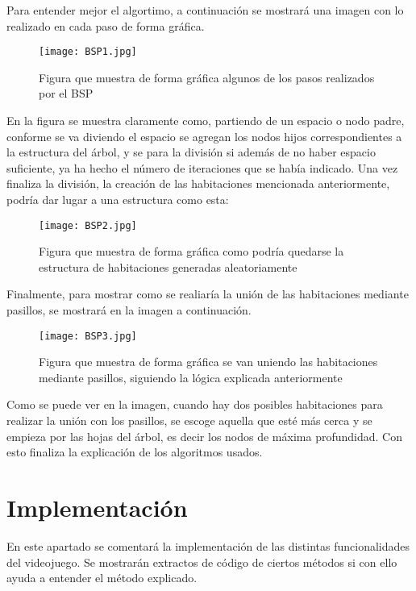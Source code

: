 Para entender mejor el algortimo, a continuación se mostrará una imagen con lo realizado en cada paso de forma gráfica.

\begin{figure}[H]
    \centering
    \texttt{[image: BSP1.jpg]}
    \caption{Figura que muestra de forma gráfica algunos de los pasos realizados por el BSP}
\end{figure}

En la figura se muestra claramente como, partiendo de un espacio o nodo padre, conforme se va diviendo el espacio se agregan los nodos hijos correspondientes a la estructura del árbol, y se para la división si además de no haber espacio suficiente, ya ha hecho el número de iteraciones que se había indicado. Una vez finaliza la división, la creación de las habitaciones mencionada anteriormente, podría dar lugar a una estructura como esta:

\begin{figure}[H]
    \centering
    \texttt{[image: BSP2.jpg]}
    \caption{Figura que muestra de forma gráfica como podría quedarse la estructura de habitaciones generadas aleatoriamente}
\end{figure}

Finalmente, para mostrar como se realiaría la unión de las habitaciones mediante pasillos, se mostrará en la imagen a continuación.

\begin{figure}[H]
    \centering
    \texttt{[image: BSP3.jpg]}
    \caption{Figura que muestra de forma gráfica se van uniendo las habitaciones mediante pasillos, siguiendo la lógica explicada anteriormente}
\end{figure}

Como se puede ver en la imagen, cuando hay dos posibles habitaciones para realizar la unión con los pasillos, se escoge aquella que esté más cerca y se empieza por las hojas del árbol, es decir los nodos de máxima profundidad. Con esto finaliza la explicación de los algoritmos usados.

\section{Implementación}
\label{sec:implementacion}

En este apartado se comentará la implementación  de las distintas funcionalidades del videojuego. Se mostrarán extractos de código de ciertos métodos si con ello ayuda a entender el método explicado.


